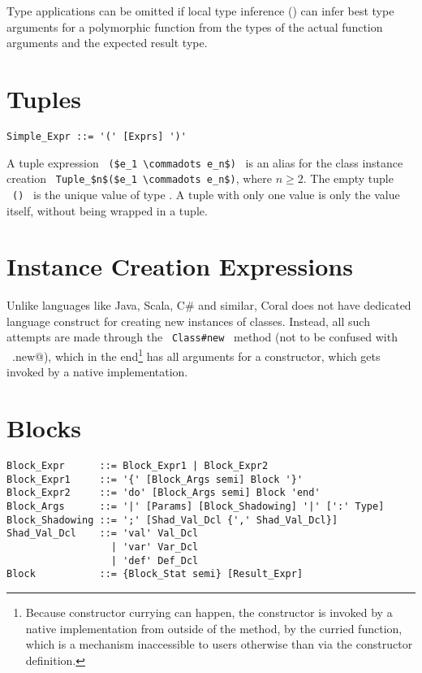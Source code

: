 Type applications can be omitted if local type inference () can infer best type arguments for a polymorphic function from the types of the actual function arguments and the expected result type. 





\section{Tuples}
\label{sec:tuples}

\syntax\begin{lstlisting}
Simple_Expr ::= '(' [Exprs] ')'
\end{lstlisting}

A tuple expression ~\lstinline!($e_1 \commadots e_n$)!~ is an alias for the class instance creation ~\lstinline!Tuple_$n$($e_1 \commadots e_n$)!, where $n \geq 2$. The empty tuple ~\lstinline!()!~ is the unique value of type . A tuple with only one value is only the value itself, without being wrapped in a tuple. 






\section{Instance Creation Expressions}
\label{sec:instance-creation-exprs}

Unlike languages like Java, Scala, C\# and similar, Coral does not have dedicated language construct for creating new instances of classes. Instead, all such attempts are made through the ~\lstinline!Class#new!~ method (not to be confused with ~\lstinline@Class.new@), which in the end\footnote{Because constructor currying can happen, the constructor is invoked by a native implementation from outside of the  method, by the curried function, which is a mechanism inaccessible to users otherwise than via the constructor definition.} has all arguments for a constructor, which gets invoked by a native implementation. 






\section{Blocks}
\label{sec:blocks}

\syntax\begin{lstlisting}
Block_Expr      ::= Block_Expr1 | Block_Expr2
Block_Expr1     ::= '{' [Block_Args semi] Block '}'
Block_Expr2     ::= 'do' [Block_Args semi] Block 'end'
Block_Args      ::= '|' [Params] [Block_Shadowing] '|' [':' Type]
Block_Shadowing ::= ';' [Shad_Val_Dcl {',' Shad_Val_Dcl}]
Shad_Val_Dcl    ::= 'val' Val_Dcl
                  | 'var' Var_Dcl
                  | 'def' Def_Dcl
Block           ::= {Block_Stat semi} [Result_Expr]
\end{lstlisting}

